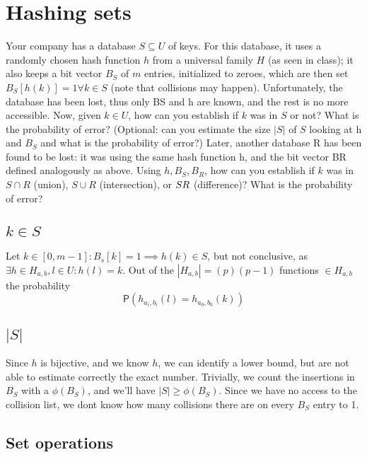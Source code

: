 \documentclass{article}
\newcommand*{\prob}{\mathsf{P}}    %
\begin{document}
\newpage
\section{Hashing sets}

Your company has a database $S \subseteq U$ of keys. For this database, it uses
a randomly chosen hash function $h$ from a universal family $H$ (as seen in class);
it also keeps a bit vector $B_S$ of $m$ entries, initialized to zeroes, which are
then set $B_S[h(k)] = 1 \forall k \in S$ (note that collisions may happen).
Unfortunately, the database has been lost, thus only BS and h are known, and the
rest is no more accessible.
Now, given $k \in U$, how can you establish if $k$ was in $S$ or not?
What is the probability of error? (Optional: can you estimate the size $|S|$ of
$S$ looking at h and $B_S$ and what is the probability of error?)
Later, another database R has been found to be lost: it was using the same hash
function h, and the bit vector BR defined analogously as above.
Using $h, B_S, B_R$, how can you establish if $k$ was in $S \cap R$ (union), $S \cup R$
(intersection), or $S \\ R$ (difference)? What is the probability of error?

\subsection{$k \in S$}
\label{k_in_s}

Let $k \in [0, m - 1]: B_s[k] = 1 \implies h(k) \in S$, but not conclusive, as
$\exists h \in H_{a,b}, l \in U: h(l) = k$.
Out of the $|H_{a, b}| = (p)(p - 1)$ functions $\in H_{a, b}$ the probability
    \begin{equation}
    \prob(h_{a_{i},b_{i}}(l) = h_{a_{0},b_{0}}(k))
    \end{equation}

\subsection{$|S|$}
\label{size_of_S}

Since $h$ is bijective, and we know $h$, we can identify a lower bound, but are
not able to estimate correctly the exact number.
Trivially, we count the insertions in $B_S$ with a $\phi(B_S)$, and we'll have
$|S| \geq \phi(B_S)$.
Since we have no access to the collision list, we dont know how many collisions
there are on every $B_S$ entry to 1.

\subsection{Set operations}
\end{document}
